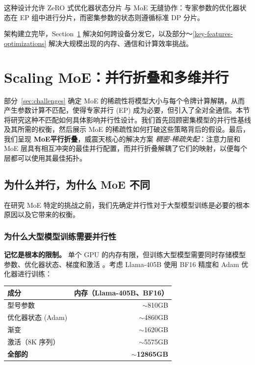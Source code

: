 这种设计允许 ZeRO 式优化器状态分片 \cite{rajbhandari2020zero} 与 MoE 无缝协作：专家参数的优化器状态在 EP 组中进行分片，而密集参数的状态则遵循标准 DP 分片。

架构建立完毕，Section~\ref{parallelism-strategies} 解决如何跨设备分发它，以及部分〜\ref{key-features-optimizations} 解决大规模出现的内存、通信和计算效率挑战。

\section{Scaling MoE：并行折叠和多维并行}\label{parallelism-strategies}

部分~\ref{sec:challenges} 确定 MoE 的稀疏性将模型大小与每个令牌计算解耦，从而产生参数计算不匹配，使得专家并行 (EP) 成为必要，但引入了全对全通信。本节将研究这种不匹配如何具体影响并行性设计。我们首先回顾密集模型的并行性基线及其所需的权衡，然后展示 MoE 的稀疏性如何打破这些策略背后的假设。最后，我们呈现 \textbf{MoE平行折叠}，威震天核心的解决方案 \emph{稠密-稀疏失配}：注意力层和 MoE 层具有相互冲突的最佳并行配置，而并行折叠解耦了它们的映射，以便每个层都可以使用其最佳拓扑。

\subsection{为什么并行，为什么 MoE 不同}\label{sec:why-parallelism}

在研究 MoE 特定的挑战之前，我们先确定并行性对于大型模型训练是必要的根本原因以及它带来的权衡。

\subsubsection{为什么大型模型训练需要并行性}

\textbf{记忆是根本的限制。} 单个 GPU 的内存有限，但训练大型模型需要同时存储模型参数、优化器状态、梯度和激活 \cite{rasley2020deepspeed}。考虑 Llama-405B \cite{grattafiori2024llama3herdmodels,touvron2023llama,touvron2023llama2} 使用 BF16 精度和 Adam 优化器进行训练：

\begin{center}
\begin{tabular}{lr}
\toprule
\textbf{成分} & \textbf{内存（Llama-405B、BF16）} \\
\midrule
型号参数 & $\sim$810GB \\
优化器状态 (Adam) & $\sim$4860GB \\
渐变 & $\sim$1620GB \\
激活（8K 序列） & $\sim$5575GB \\
\midrule
\textbf{全部的} & \textbf{$\sim$12865GB} \\
\bottomrule
\end{tabular}
\end{center}

